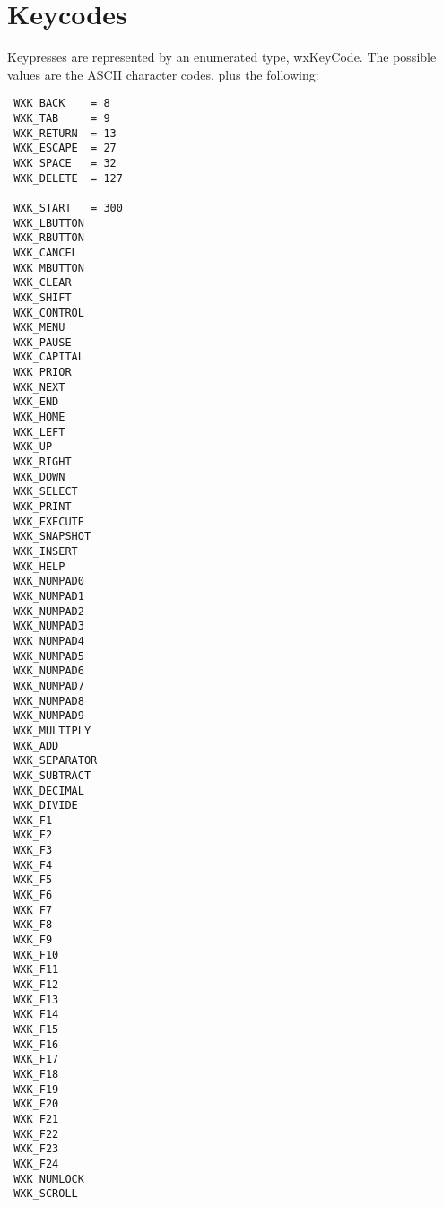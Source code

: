 \section{Keycodes}\label{keycodes}

Keypresses are represented by an enumerated type, wxKeyCode. The possible values
are the ASCII character codes, plus the following:

{\small
\begin{verbatim}
 WXK_BACK    = 8
 WXK_TAB     = 9
 WXK_RETURN  = 13
 WXK_ESCAPE  = 27
 WXK_SPACE   = 32
 WXK_DELETE  = 127

 WXK_START   = 300
 WXK_LBUTTON
 WXK_RBUTTON
 WXK_CANCEL
 WXK_MBUTTON
 WXK_CLEAR
 WXK_SHIFT
 WXK_CONTROL
 WXK_MENU
 WXK_PAUSE
 WXK_CAPITAL
 WXK_PRIOR
 WXK_NEXT
 WXK_END
 WXK_HOME
 WXK_LEFT
 WXK_UP
 WXK_RIGHT
 WXK_DOWN
 WXK_SELECT
 WXK_PRINT
 WXK_EXECUTE
 WXK_SNAPSHOT
 WXK_INSERT
 WXK_HELP
 WXK_NUMPAD0
 WXK_NUMPAD1
 WXK_NUMPAD2
 WXK_NUMPAD3
 WXK_NUMPAD4
 WXK_NUMPAD5
 WXK_NUMPAD6
 WXK_NUMPAD7
 WXK_NUMPAD8
 WXK_NUMPAD9
 WXK_MULTIPLY
 WXK_ADD
 WXK_SEPARATOR
 WXK_SUBTRACT
 WXK_DECIMAL
 WXK_DIVIDE
 WXK_F1
 WXK_F2
 WXK_F3
 WXK_F4
 WXK_F5
 WXK_F6
 WXK_F7
 WXK_F8
 WXK_F9
 WXK_F10
 WXK_F11
 WXK_F12
 WXK_F13
 WXK_F14
 WXK_F15
 WXK_F16
 WXK_F17
 WXK_F18
 WXK_F19
 WXK_F20
 WXK_F21
 WXK_F22
 WXK_F23
 WXK_F24
 WXK_NUMLOCK
 WXK_SCROLL 
\end{verbatim}
}

